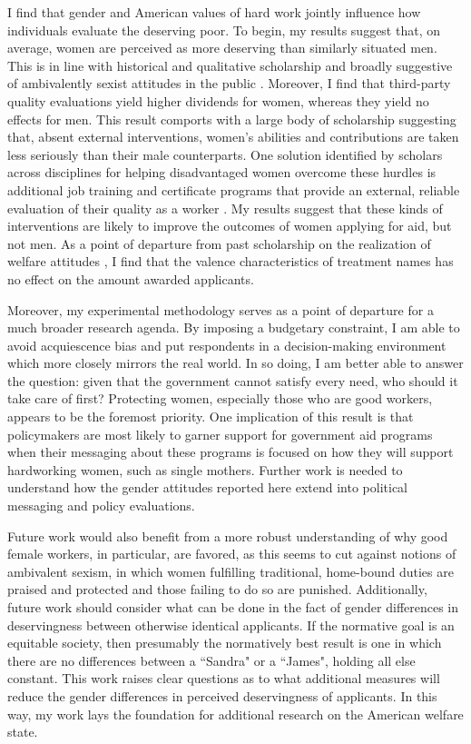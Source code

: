 \documentclass[12pt]{article}%
\begin{document}
\begin{doublespace}
I find that gender and American values of hard work jointly influence how individuals evaluate the deserving poor. To begin, my results suggest that, on average, women are perceived as more deserving than similarly situated men. This is in line with historical and qualitative scholarship \cite{willrich2000home} and broadly suggestive of ambivalently sexist attitudes in the public \citep{glick_ambivalent_2001, glick_hostile_1997}. Moreover, I find that third-party quality evaluations yield higher dividends for women, whereas they yield no effects for men. This result comports with a large body of scholarship suggesting that, absent external interventions, women's abilities and contributions are taken less seriously than their male counterparts. One solution identified by scholars across disciplines for helping disadvantaged women overcome these hurdles is additional job training and certificate programs that provide an external, reliable evaluation of their quality as a worker \citep{abel_value_2020, dadgar_labor_2015, jepsen_labor-market_2014}. My results suggest that these kinds of interventions are likely to improve the outcomes of women applying for aid, but not men. As a point of departure from past scholarship on the realization of welfare attitudes \citep{hayes_2020}, I find that the valence characteristics of treatment names has no effect on the amount awarded applicants.

Moreover, my experimental methodology serves as a point of departure for a much broader research agenda. By imposing a budgetary constraint, I am able to avoid acquiescence bias and put respondents in a decision-making environment which more closely mirrors the real world. In so doing, I am better able to answer the question: given that the government cannot satisfy every need, who should it take care of first? Protecting women, especially those who are good workers, appears to be the foremost priority. One implication of this result is that policymakers are most likely to garner support for government aid programs when their messaging about these programs is focused on how they will support hardworking women, such as single mothers. Further work is needed to understand how the gender attitudes reported here extend into political messaging and policy evaluations.

Future work would also benefit from a more robust understanding of why good female workers, in particular, are favored, as this seems to cut against notions of ambivalent sexism, in which women fulfilling traditional, home-bound duties are praised and protected and those failing to do so are punished. Additionally, future work should consider what can be done in the fact of gender differences in deservingness between otherwise identical applicants. If the normative goal is an equitable society, then presumably the normatively best result is one in which there are no differences between a ``Sandra" or a ``James", holding all else constant. This work raises clear questions as to what additional measures will reduce the gender differences in perceived deservingness of applicants. In this way, my work lays the foundation for additional research on the American welfare state.


\end{doublespace}
\end{document}
